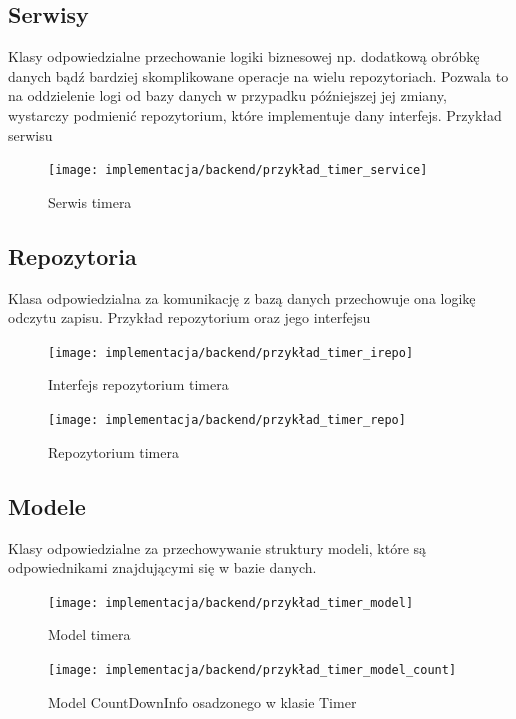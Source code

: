 \documentclass[a4paper,11pt]{report}
\begin{document}
\subsection{Serwisy}
Klasy odpowiedzialne przechowanie logiki biznesowej np. dodatkową obróbkę danych bądź bardziej skomplikowane operacje na wielu repozytoriach.
Pozwala to na oddzielenie logi od bazy danych w przypadku późniejszej jej zmiany, wystarczy podmienić repozytorium, które implementuje dany interfejs.
Przykład serwisu
\begin{figure}[H]
	\centering
	\texttt{[image: implementacja/backend/przykład\_timer\_service]}\\
	\caption{Serwis timera}
	\label{fig:przykład_timer_service}
\end{figure}
\subsection{Repozytoria}
Klasa odpowiedzialna za komunikację z bazą danych przechowuje ona logikę odczytu zapisu. 
Przykład repozytorium oraz jego interfejsu
\begin{figure}[H]
	\centering
	\texttt{[image: implementacja/backend/przykład\_timer\_irepo]}\\
	\caption{Interfejs repozytorium timera}
	\label{fig:przykład_timer_irepo}
\end{figure}
\begin{figure}[H]
	\centering
	\texttt{[image: implementacja/backend/przykład\_timer\_repo]}\\
	\caption{Repozytorium timera}
	\label{fig:przykład_timer_repo}
\end{figure}
\subsection{Modele}
Klasy odpowiedzialne za przechowywanie struktury modeli, które są odpowiednikami znajdującymi się w bazie danych.
\begin{figure}[H]
	\centering
	\texttt{[image: implementacja/backend/przykład\_timer\_model]}\\
	\caption{Model timera}
	\label{fig:przykład_timer_model}
\end{figure}
\begin{figure}[H]
	\centering
	\texttt{[image: implementacja/backend/przykład\_timer\_model\_count]}\\
	\caption{Model CountDownInfo osadzonego w klasie Timer}
	\label{fig:przykład_timer_model_count}
\end{figure}
\end{document}

